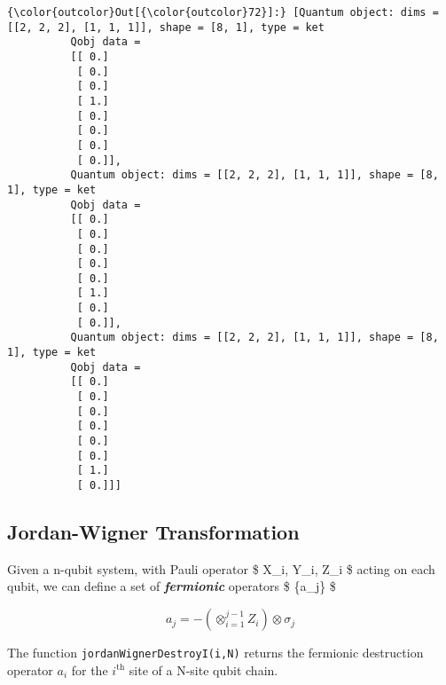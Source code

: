 \documentclass{article}
\begin{document}
            \begin{Verbatim}[commandchars=\\\{\}]
{\color{outcolor}Out[{\color{outcolor}72}]:} [Quantum object: dims = [[2, 2, 2], [1, 1, 1]], shape = [8, 1], type = ket
          Qobj data =
          [[ 0.]
           [ 0.]
           [ 0.]
           [ 1.]
           [ 0.]
           [ 0.]
           [ 0.]
           [ 0.]],
          Quantum object: dims = [[2, 2, 2], [1, 1, 1]], shape = [8, 1], type = ket
          Qobj data =
          [[ 0.]
           [ 0.]
           [ 0.]
           [ 0.]
           [ 0.]
           [ 1.]
           [ 0.]
           [ 0.]],
          Quantum object: dims = [[2, 2, 2], [1, 1, 1]], shape = [8, 1], type = ket
          Qobj data =
          [[ 0.]
           [ 0.]
           [ 0.]
           [ 0.]
           [ 0.]
           [ 0.]
           [ 1.]
           [ 0.]]]
\end{Verbatim}
        
    \subsection{Jordan-Wigner
Transformation}\label{jordan-wigner-transformation}

Given a n-qubit system, with Pauli operator \$ X\_i, Y\_i, Z\_i \$
acting on each qubit, we can define a set of \textbf{\emph{fermionic}}
operators \$ \{a\_j\} \$

\[ a_j = -\left(\otimes_{i=1}^{j-1} Z_i \right) \otimes \sigma_j \]

The function \texttt{jordanWignerDestroyI(i,N)} returns the fermionic
destruction operator \(a_i\) for the \(i^\text{th}\) site of a N-site
qubit chain.
\end{document}
